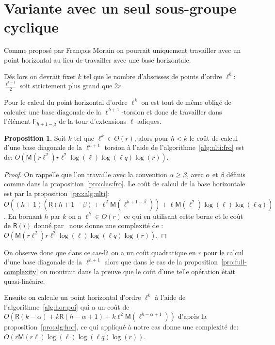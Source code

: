 \documentclass[10pt,a4paper]{book}
\theoremstyle{plain}
\theoremstyle{definition}
\theoremstyle{definition}
\theoremstyle{definition}
\newtheorem{prop}[thm]{Proposition}
\theoremstyle{definition}
\theoremstyle{remark}
\theoremstyle{remark}
\theoremstyle{definition}
\begin{document}
\section{Variante avec un seul sous-groupe cyclique}
Comme proposé par François Morain on pourrait uniquement travailler avec un 
point horizontal au lieu de travailler avec une base horizontale.

Dés lors on devrait fixer $k$ tel que le nombre d'abscisses de points d'ordre 
$\ell^k:$ $\frac{\ell^{k-1}}{2}$ soit strictement plus grand que $2r$.

Pour le calcul du point horizontal d'ordre $\ell^k$ on est tout de même obligé 
de calculer une base diagonale de la $\ell^{h+1}$-torsion et donc de 
travailler dans l'élément $\mathsf{F}_{h+1-\beta}$ de la tour d'extensions 
$\ell$-adiques.

\begin{prop}
Soit $k$ tel que $\ell^k \in O(r)$, alors pour $h<k$ le coût de calcul d'une 
base diagonale de la $\ell^{h+1}$ torsion à l'aide de 
l'algorithme~\ref{alg:ulti:fro} est de:
$O(\mathsf{M}(r\ell^2)r\ell^2\log(\ell)\log(\ell q) \log(r))$.
\end{prop}

\begin{proof}
On rappelle que l'on travaille avec la convention $\alpha \geqslant \beta$, 
avec $\alpha$ et $\beta$ définis comme dans la proposition~\ref{pro:clas:fro}.
Le coût de calcul de la base horizontale est par la proposition~\ref{pro:alg:ulti}:
$O((h+1)(\mathsf{R}(h+1-\beta)+\ell^2 \mathsf{M}(\ell^{h+1-\beta}))+\ell \mathsf{M}(\ell^2)\log(\ell)\log(\ell q))$. 
En bornant $h$ par $k$ on a $\ell^h \in O(r)$ ce qui en utilisant cette
borne et le coût de $\mathsf{R}(i)$ donné par~\cite[chapter 14.5]{vzGJG03} nous 
donne une complexité de :
$O(\mathsf{M}(r\ell^2)r\ell^2\log(\ell)\log(\ell q) \log(r))$.
\end{proof}
On observe donc que dans ce cas-là on a un coût quadratique en $r$ pour le 
calcul d'une base diagonale de la $\ell^{h+1}$ alors que dans le cas de la 
proposition~\ref{pro:full-complexity} on montrait dans la preuve que le coût 
d'une telle opération était quasi-linéaire.

Ensuite on calcule un point horizontal d'ordre $\ell^k$ à l'aide de 
l'algorithme~\ref{alg:hor:poi} qui a un coût de 
$O(\mathsf{R}(k-\alpha) + k\mathsf{R}(h-\alpha+1) + k\ell^2\mathsf{M}(\ell^{h-\alpha+1}))$
d'après la proposition~\ref{pro:alg:hor}, ce qui appliqué à notre cas donne 
une complexité de: $O(r \mathsf{M}(r \ell)\log(\ell)\log(\ell q) \log(r))$.
\end{document}
